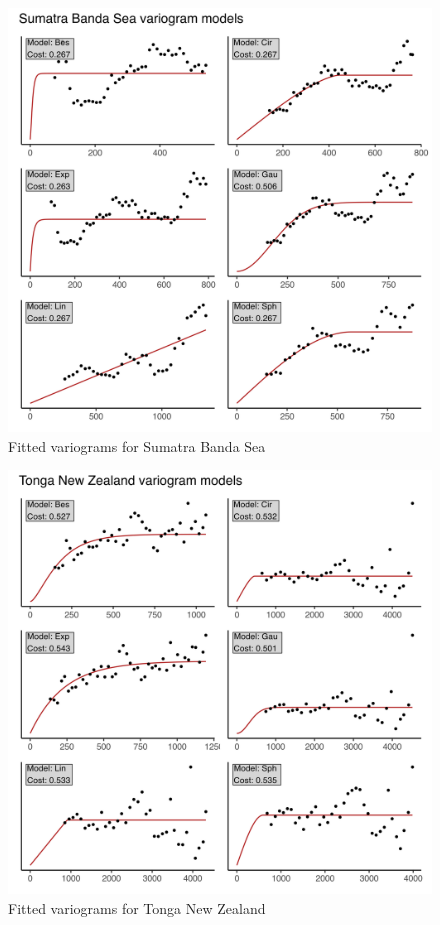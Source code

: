 \begin{figure}
\centering
\includegraphics{assets/figs/chpt3/SumatraBandaSeaVgrms.png}
\caption[Fitted variograms for Sumatra Banda Sea]{Fitted variograms for Sumatra Banda Sea}
\end{figure}

\begin{figure}
\centering
\includegraphics{assets/figs/chpt3/TongaNewZealandVgrms.png}
\caption[Fitted variograms for Tonga New Zealand]{Fitted variograms for Tonga New Zealand}
\end{figure}

